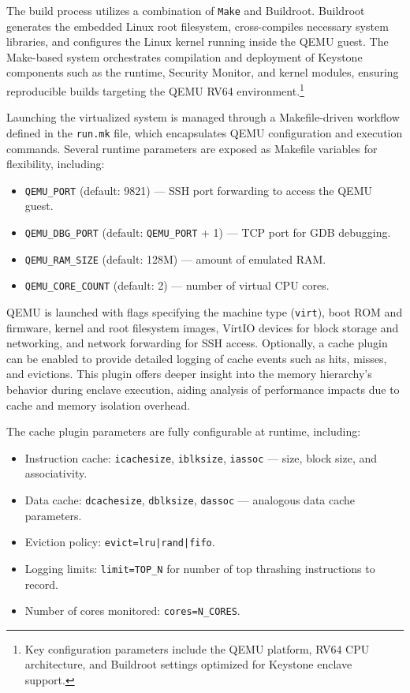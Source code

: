 The build process utilizes a combination of \texttt{Make} and Buildroot. Buildroot generates the embedded Linux root filesystem, cross-compiles necessary system libraries, and configures the Linux kernel running inside the QEMU guest. The Make-based system orchestrates compilation and deployment of Keystone components such as the runtime, Security Monitor, and kernel modules, ensuring reproducible builds targeting the QEMU RV64 environment.\footnote{Key configuration parameters include the QEMU platform, RV64 CPU architecture, and Buildroot settings optimized for Keystone enclave support.} 

Launching the virtualized system is managed through a Makefile-driven workflow defined in the \texttt{run.mk} file, which encapsulates QEMU configuration and execution commands. Several runtime parameters are exposed as Makefile variables for flexibility, including:

\begin{itemize}
    \item \texttt{QEMU\_PORT} (default: 9821) — SSH port forwarding to access the QEMU guest.  
    \item \texttt{QEMU\_DBG\_PORT} (default: \texttt{QEMU\_PORT} + 1) — TCP port for GDB debugging.  
    \item \texttt{QEMU\_RAM\_SIZE} (default: 128M) — amount of emulated RAM.  
    \item \texttt{QEMU\_CORE\_COUNT} (default: 2) — number of virtual CPU cores.
\end{itemize}

QEMU is launched with flags specifying the machine type (\texttt{virt}), boot ROM and firmware, kernel and root filesystem images, VirtIO devices for block storage and networking, and network forwarding for SSH access. Optionally, a cache plugin \cite{mandour2021cache} can be enabled to provide detailed logging of cache events such as hits, misses, and evictions. This plugin offers deeper insight into the memory hierarchy’s behavior during enclave execution, aiding analysis of performance impacts due to cache and memory isolation overhead.

The cache plugin \cite{mandour2021cache} parameters are fully configurable at runtime, including:

\begin{itemize}
    \item Instruction cache: \texttt{icachesize}, \texttt{iblksize}, \texttt{iassoc} — size, block size, and associativity.  
    \item Data cache: \texttt{dcachesize}, \texttt{dblksize}, \texttt{dassoc} — analogous data cache parameters.  
    \item Eviction policy: \texttt{evict=lru|rand|fifo}.  
    \item Logging limits: \texttt{limit=TOP\_N} for number of top thrashing instructions to record.  
    \item Number of cores monitored: \texttt{cores=N\_CORES}.
\end{itemize}

